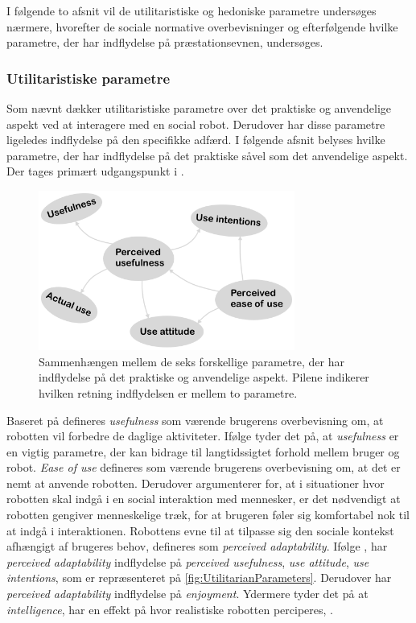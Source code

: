 I følgende to afsnit vil de utilitaristiske og hedoniske parametre undersøges nærmere, hvorefter de sociale normative overbevisninger og efterfølgende hvilke parametre, der har indflydelse på præstationsevnen, undersøges.
%   
\vfill
\subsubsection*{Utilitaristiske parametre}
\label{InteraktionSocialeRobotterParametreUtilitarian}
%
Som nævnt dækker utilitaristiske parametre over det praktiske og anvendelige aspekt ved at interagere med en social robot. Derudover har disse parametre ligeledes indflydelse på den specifikke adfærd. I følgende afsnit belyses hvilke parametre, der har indflydelse på det praktiske såvel som det anvendelige aspekt. Der tages primært udgangspunkt i \textcite[s. 1477]{PDF:SharingALifeHarvey}.
%
\begin{figure}[H]
\centering
\includegraphics[width = 0.75\textwidth]{Figure/Introduktion/UtilitarianParameters} 
\caption{Sammenhængen mellem de seks forskellige parametre, der har indflydelse på det praktiske og anvendelige aspekt. Pilene indikerer hvilken retning indflydelsen er mellem to parametre.}
\label{fig:UtilitarianParameters}
\end{figure}
\noindent 
%
Baseret på \textcite[s. 1477]{PDF:SharingALifeHarvey} defineres \textit{usefulness} som værende brugerens overbevisning om, at robotten vil forbedre de daglige aktiviteter. Ifølge \textcite[s. 11]{PDF:SharingALifeHarvey} tyder det på, at \textit{usefulness} er en vigtig parametre, der kan bidrage til langtidssigtet forhold mellem bruger og robot. \textit{Ease of use} defineres som værende brugerens overbevisning om, at det er nemt at anvende robotten. Derudover argumenterer \textcite[s. 1477]{PDF:SharingALifeHarvey} for, at i situationer hvor robotten skal indgå i en social interaktion med mennesker, er det nødvendigt at robotten gengiver menneskelige træk, for at brugeren føler sig komfortabel nok til at indgå i interaktionen. Robottens evne til at tilpasse sig den sociale kontekst afhængigt af brugeres behov, defineres som \textit{perceived adaptability}. Ifølge \textcite[s. 1477]{PDF:SharingALifeHarvey}, har \textit{perceived adaptability} indflydelse på \textit{perceived usefulness}, \textit{use attitude}, \textit{use intentions}, som er repræsenteret på \autoref{fig:UtilitarianParameters}. Derudover har \textit{perceived adaptability} indflydelse på \textit{enjoyment}. Ydermere tyder det på at \textit{intelligence}, har en effekt på hvor realistiske robotten perciperes, \parencite[s. 1477]{PDF:ExploringInfluencingVariable}.   
%

